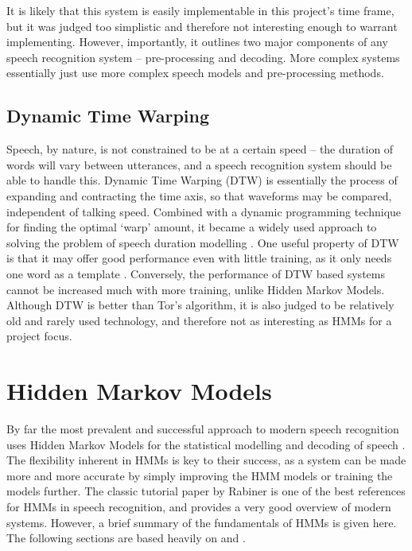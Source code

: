 		It is likely that this system is easily implementable in this project's time frame, but it was judged too simplistic and therefore not interesting enough to warrant implementing.  However, importantly, it outlines two major components of any speech recognition system -- pre-processing and decoding.  More complex systems essentially just use more complex speech models and pre-processing methods.

	\subsection{Dynamic Time Warping} %
		\label{sub:dynamic_time_warping}
		Speech, by nature, is not constrained to be at a certain speed -- the duration of words will vary between utterances, and a speech recognition system should be able to handle this.  Dynamic Time Warping (DTW)  is essentially the process of expanding and contracting the time axis, so that waveforms may be compared, independent of talking speed.  Combined with a dynamic programming technique for finding the optimal `warp' amount, it became a widely used approach to solving the problem of speech duration modelling \cite{furui1989speech}.  One useful property of DTW is that it may offer good performance even with little training, as it only needs one word as a template \cite{melnikoff2003speech}.  Conversely, the performance of DTW based systems cannot be increased much with more training, unlike Hidden Markov Models.
		Although DTW is better than Tor's algorithm, it is also judged to be relatively old and rarely used technology, and therefore not as interesting as HMMs for a project focus.


\section{Hidden Markov Models} %
\label{sec:about_hmms}
	By far the most prevalent and successful approach to modern speech recognition uses Hidden Markov Models for the statistical modelling and decoding of speech \cite{cox1988hidden}.  The flexibility inherent in HMMs is key to their success, as a system can be made more and more accurate by simply improving the HMM models or training the models further.  The classic tutorial paper by Rabiner\cite{rabiner1989tutorial} is one of the best references for HMMs in speech recognition, and provides a very good overview of modern systems.  However, a brief summary of the fundamentals of HMMs is given here. The following sections are based heavily on \cite{rabiner1989tutorial} and \cite{htkbook}.

